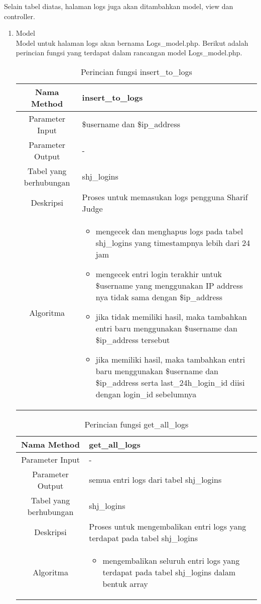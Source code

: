 Selain tabel diatas, halaman logs juga akan ditambahkan model, view dan controller.
\begin{enumerate}
	\item Model \\
	Model untuk halaman logs akan bernama Logs\_model.php. Berikut adalah perincian fungsi yang terdapat dalam rancangan model Logs\_model.php.
	\begin{table}[H]
		\caption{Perincian fungsi insert\_to\_logs}
		\begin{tabular}{|c|p{11cm}|}
			\hline
			Nama Method 	& 	insert\_to\_logs 	\\
			\hline
			Parameter Input & \$username dan \$ip\_address \\
			\hline
			Parameter Output & -\\
			\hline
			Tabel yang berhubungan & shj\_logins \\
			\hline
			Deskripsi	& Proses untuk memasukan logs pengguna Sharif Judge \\
			\hline
			Algoritma	& \begin{itemize}
				\item mengecek dan menghapus logs pada tabel shj\_logins yang timestampnya lebih dari 24 jam
				\item mengecek entri login terakhir untuk \$username yang  menggunakan IP address nya tidak sama dengan \$ip\_address
				\item jika tidak memiliki hasil, maka tambahkan entri baru menggunakan \$username dan \$ip\_address tersebut
				\item jika memiliki hasil,  maka tambahkan entri baru menggunakan \$username dan \$ip\_address serta last\_24h\_login\_id diisi dengan login\_id sebelumnya
			\end{itemize} \\
			\hline
		\end{tabular}
	\end{table}

	\begin{table}[H]
		\caption{Perincian fungsi get\_all\_logs}
		\begin{tabular}{|c|p{11cm}|}
			\hline
			Nama Method 	& 	get\_all\_logs 	\\
			\hline
			Parameter Input & - \\
			\hline
			Parameter Output &  semua entri logs dari tabel shj\_logins\\
			\hline
			Tabel yang berhubungan & shj\_logins \\
			\hline
			Deskripsi	& Proses untuk mengembalikan entri logs yang terdapat pada tabel shj\_logins \\
			\hline
			Algoritma	& \begin{itemize}
				\item mengembalikan seluruh entri logs yang terdapat pada tabel shj\_logins dalam bentuk array
			\end{itemize} \\
			\hline
		\end{tabular}
	\end{table}


\end{enumerate}
